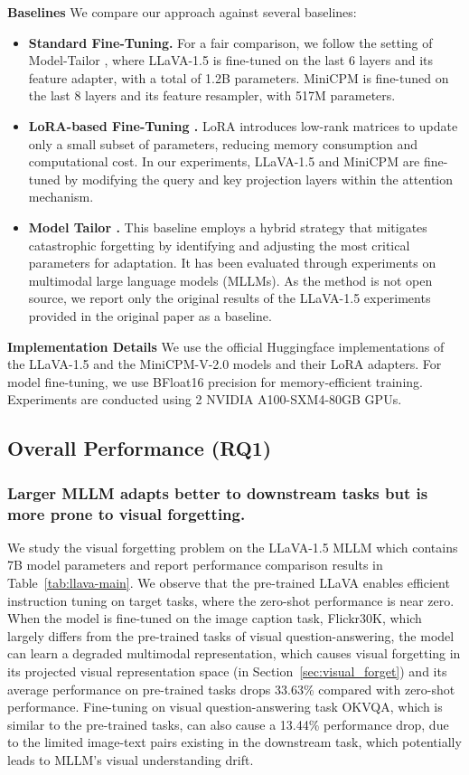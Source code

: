 \noindent\textbf{Baselines} We compare our approach against several baselines: 
\begin{itemize}
\item \textbf{Standard Fine-Tuning.} For a fair comparison, we follow the setting of Model-Tailor \cite{zhu2024model}, where LLaVA-1.5 is fine-tuned on the last 6 layers and its feature adapter, with a total of 1.2B parameters.
MiniCPM is fine-tuned on the last 8 layers and its feature resampler, with 517M parameters. 
\item \textbf{LoRA-based Fine-Tuning \citep{hu2021lora}.} LoRA introduces low-rank matrices to update only a small subset of parameters, reducing memory consumption and computational cost. In our experiments, LLaVA-1.5 and MiniCPM are fine-tuned by modifying the query and key projection layers within the attention mechanism. 
\item \textbf{Model Tailor \citep{zhu2024model}.} This baseline employs a hybrid strategy that mitigates catastrophic forgetting by identifying and adjusting the most critical parameters for adaptation. It has been evaluated through experiments on multimodal large language models (MLLMs). As the method is not open source, we report only the original results of the LLaVA-1.5 experiments provided in the original paper as a baseline.
\end{itemize}


\noindent\textbf{Implementation Details}
We use the official Huggingface implementations of the LLaVA-1.5 and the MiniCPM-V-2.0 models and their LoRA adapters. 
For model fine-tuning, we use BFloat16 precision for memory-efficient training. 
Experiments are conducted using 2 NVIDIA A100-SXM4-80GB GPUs.

\subsection{Overall Performance (RQ1)}\label{sec:main-results}
\subsubsection{Larger MLLM adapts better to downstream tasks but is more prone to visual forgetting.}
We study the visual forgetting problem on the LLaVA-1.5 MLLM which contains 7B model parameters 
and report performance comparison results in Table~\ref{tab:llava-main}.
We observe that the pre-trained LLaVA enables efficient instruction tuning on target tasks,
where the zero-shot performance is near zero.
When the model is fine-tuned on the image caption task, Flickr30K, which largely differs from the pre-trained tasks of visual question-answering,
the model can learn a degraded multimodal representation,
which causes visual forgetting in its projected visual representation space (in Section~\ref{sec:visual_forget}) 
and its average performance on pre-trained tasks drops 33.63\% compared with zero-shot performance. 
Fine-tuning on visual question-answering task OKVQA, which is similar to the pre-trained tasks, can also cause a 13.44\% performance drop,
due to the limited image-text pairs existing in the downstream task, which potentially leads to MLLM's visual understanding drift.

